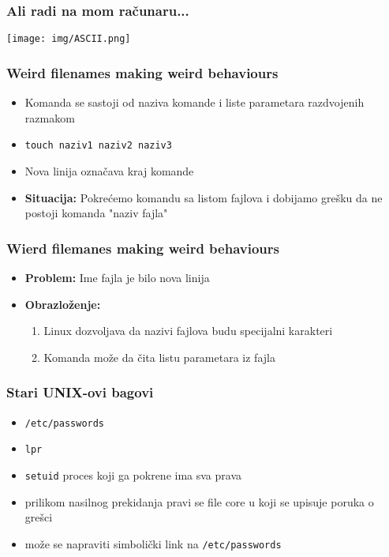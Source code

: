 \documentclass{beamer}
\begin{document}
\begin{frame}
    \frametitle{Ali radi na mom računaru...}
    \begin{center}
        \texttt{[image: img/ASCII.png]}
    \end{center}
\end{frame}


\begin{frame}
\frametitle{Weird filenames making weird behaviours}
\begin{itemize}
    \item Komanda se sastoji od naziva komande i liste parametara razdvojenih razmakom \newline
    \item \lstinline|touch naziv1 naziv2 naziv3| \newline
    \item Nova linija označava kraj komande \newline
    \item \textbf{Situacija:} Pokrećemo komandu sa listom fajlova i dobijamo grešku da ne postoji komanda "naziv fajla" \newline
        
\end{itemize}
\end{frame}

\begin{frame}
    \frametitle{Wierd filemanes making weird behaviours}
    \begin{itemize}
        \item \textbf{Problem:} Ime fajla je bilo nova linija \newline
        \item \textbf{Obrazloženje: } \begin{enumerate}
            \item Linux dozvoljava da nazivi fajlova budu specijalni karakteri \newline
            \item Komanda može da čita listu parametara iz fajla
        \end{enumerate}
    \end{itemize}
\end{frame}

\begin{frame}
    \frametitle{Stari UNIX-ovi bagovi}
    \begin{itemize}
        \item \lstinline|/etc/passwords| \newline
        \item \lstinline|lpr| \newline
        \item \lstinline|setuid| proces koji ga pokrene ima sva prava \newline
        \item prilikom nasilnog prekidanja pravi se file core u koji se upisuje poruka o grešci \newline
        \item može se napraviti simbolički link na \lstinline|/etc/passwords|
    \end{itemize}
\end{frame}
\end{document}

